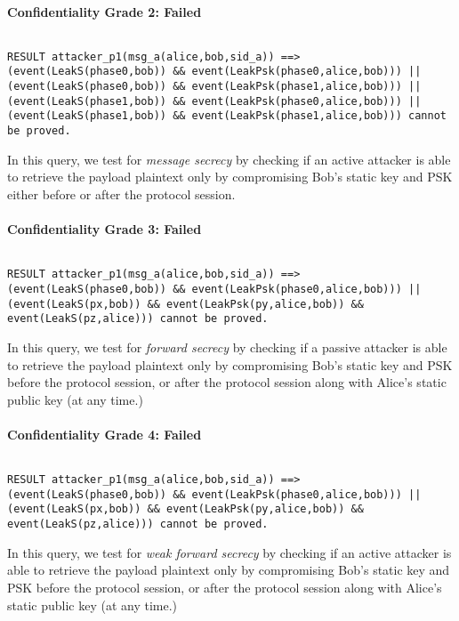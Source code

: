 \paragraph{Confidentiality Grade 2: Failed}$ $
\begin{lstlisting}
RESULT attacker_p1(msg_a(alice,bob,sid_a)) ==> (event(LeakS(phase0,bob)) && event(LeakPsk(phase0,alice,bob))) || (event(LeakS(phase0,bob)) && event(LeakPsk(phase1,alice,bob))) || (event(LeakS(phase1,bob)) && event(LeakPsk(phase0,alice,bob))) || (event(LeakS(phase1,bob)) && event(LeakPsk(phase1,alice,bob))) cannot be proved.
\end{lstlisting}

In this query, we test for \emph{message secrecy} by checking if an active attacker is able to retrieve the payload plaintext only by compromising Bob's static key and PSK either before or after the protocol session.


\paragraph{Confidentiality Grade 3: Failed}$ $
\begin{lstlisting}
RESULT attacker_p1(msg_a(alice,bob,sid_a)) ==> (event(LeakS(phase0,bob)) && event(LeakPsk(phase0,alice,bob))) || (event(LeakS(px,bob)) && event(LeakPsk(py,alice,bob)) && event(LeakS(pz,alice))) cannot be proved.
\end{lstlisting}

In this query, we test for \emph{forward secrecy} by checking if a passive attacker is able to retrieve the payload plaintext only by compromising Bob's static key and PSK before the protocol session, or after the protocol session along with Alice's static public key (at any time.)


\paragraph{Confidentiality Grade 4: Failed}$ $
\begin{lstlisting}
RESULT attacker_p1(msg_a(alice,bob,sid_a)) ==> (event(LeakS(phase0,bob)) && event(LeakPsk(phase0,alice,bob))) || (event(LeakS(px,bob)) && event(LeakPsk(py,alice,bob)) && event(LeakS(pz,alice))) cannot be proved.
\end{lstlisting}

In this query, we test for \emph{weak forward secrecy} by checking if an active attacker is able to retrieve the payload plaintext only by compromising Bob's static key and PSK before the protocol session, or after the protocol session along with Alice's static public key (at any time.)


